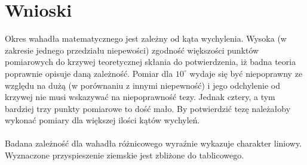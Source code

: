 \documentclass[a4paper,10pt]{article}
\begin{document}
\section{Wnioski}
Okres wahadła matematycznego jest zależny od kąta wychylenia. Wysoka (w zakresie jednego przedziału niepewości) zgodność większości punktów pomiarowych do krzywej teoretycznej skłania do potwierdzenia, iż badna teoria poprawnie opisuje daną zależność. Pomiar dla $10^\circ$ wydaje się być niepoprawny ze względu na dużą (w porównaniu z innymi niepewność) i jego odchylenie od krzywej nie musi wskazywać na niepoprawność tezy. Jednak cztery, a tym bardziej trzy punkty pomiarowe to dość mało. By potwierdzić tezę należałoby wykonać pomiary dla większej ilości kątów wychyleń.\\
\\
Badana zależność dla wahadła różnicowego wyraźnie wykazuje charakter liniowy. Wyznaczone przyspieszenie ziemskie jest zbliżone do tablicowego. %
\end{document}
